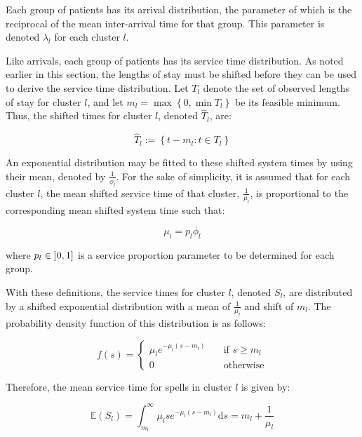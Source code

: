 \documentclass[]{interact}
\theoremstyle{plain}%
\theoremstyle{definition}
\theoremstyle{remark}
\begin{document}
Each group of patients has its arrival distribution, the parameter of which is
the reciprocal of the mean inter-arrival time for that group. This parameter
is denoted \(\lambda_l\) for each cluster \(l\).

Like arrivals, each group of patients has its service time distribution. As
noted earlier in this section, the lengths of stay must be shifted before they
can be used to derive the service time distribution. Let \(T_l\) denote the set
of observed lengths of stay for cluster \(l\), and let
\(m_l = \max \left\{0, \min T_l\right\}\) be its feasible minimum. Thus, the
shifted times for cluster \(l\), denoted \(\widehat T_l\), are:

\begin{equation}\label{eq:shifted}
    \widehat T_l := \left\{t - m_l : t \in T_l\right\}
\end{equation}

An exponential distribution may be fitted to these shifted system times by
using their mean, denoted by \(\frac{1}{\phi_l}\). For the sake of simplicity,
it is assumed that for each cluster \(l\), the mean shifted service time of that
cluster, \(\frac{1}{\mu_l}\), is proportional to the corresponding mean shifted
system time such that:

\begin{equation}\label{eq:shifted_services}
    \mu_l = p_l \phi_l
\end{equation}

\noindent where \(p_l \in \interval[open left]{0}{1}\) is a service proportion
parameter to be determined for each group.

With these definitions, the service times for cluster \(l\), denoted \(S_l\),
are distributed by a shifted exponential distribution with a mean of
\(\frac{1}{\mu_l}\) and shift of \(m_l\). The probability density function of
this distribution is as follows:

\begin{equation}\label{eq:shifted_pdf}
    f(s) = \begin{cases}
        \mu_l e^{-\mu_l (s - m_l)} & \quad \text{if \(s \ge m_l\)}\\
        0 & \quad \text{otherwise}
    \end{cases}
\end{equation}

Therefore, the mean service time for spells in cluster \(l\) is given by:

\begin{equation}\label{eq:services}
    \mathbb E \left(S_l\right)
    = \int_{m_l}^{\infty} \mu_l s e^{-\mu_l (s - m_l)} \mathrm ds
    = m_l + \frac{1}{\mu_l}
\end{equation}
\end{document}
